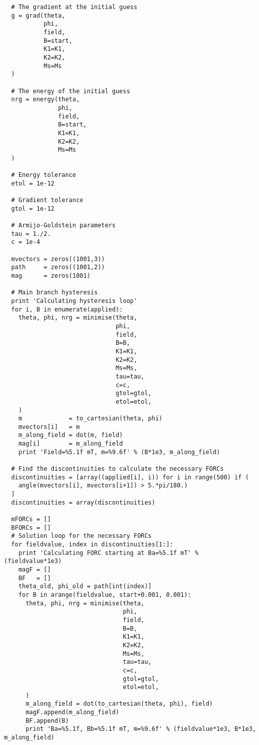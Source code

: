 \begin{lstlisting}
  # The gradient at the initial guess
  g = grad(theta,
           phi,
           field,
           B=start,
           K1=K1,
           K2=K2,
           Ms=Ms
  )

  # The energy of the initial guess
  nrg = energy(theta,
               phi,
               field,
               B=start,
               K1=K1,
               K2=K2,
               Ms=Ms
  )

  # Energy tolerance
  etol = 1e-12

  # Gradient tolerance
  gtol = 1e-12

  # Armijo-Goldstein parameters
  tau = 1./2.
  c = 1e-4

  mvectors = zeros((1001,3))
  path     = zeros((1001,2))
  mag      = zeros(1001)

  # Main branch hysteresis
  print 'Calculating hysteresis loop'
  for i, B in enumerate(applied):
    theta, phi, nrg = minimise(theta,
                               phi,
                               field,
                               B=B,
                               K1=K1,
                               K2=K2,
                               Ms=Ms,
                               tau=tau,
                               c=c,
                               gtol=gtol,
                               etol=etol,
    )
    m             = to_cartesian(theta, phi)
    mvectors[i]   = m
    m_along_field = dot(m, field)
    mag[i]        = m_along_field
    print 'Field=%5.1f mT, m=%9.6f' % (B*1e3, m_along_field)

  # Find the discontinuities to calculate the necessary FORCs
  discontinuities = [array((applied[i], i)) for i in range(500) if (
    angle(mvectors[i], mvectors[i+1]) > 5.*pi/180.)
  ]
  discontinuities = array(discontinuities)

  mFORCs = []
  BFORCs = []
  # Solution loop for the necessary FORCs
  for fieldvalue, index in discontinuities[1:]:
    print 'Calculating FORC starting at Ba=%5.1f mT' % (fieldvalue*1e3)
    magF = []
    BF   = []
    theta_old, phi_old = path[int(index)]
    for B in arange(fieldvalue, start+0.001, 0.001):
      theta, phi, nrg = minimise(theta,
                                 phi,
                                 field,
                                 B=B,
                                 K1=K1,
                                 K2=K2,
                                 Ms=Ms,
                                 tau=tau,
                                 c=c,
                                 gtol=gtol,
                                 etol=etol,
      )
      m_along_field = dot(to_cartesian(theta, phi), field)
      magF.append(m_along_field)
      BF.append(B)
      print 'Ba=%5.1f, Bb=%5.1f mT, m=%9.6f' % (fieldvalue*1e3, B*1e3, m_along_field)


\end{lstlisting}
